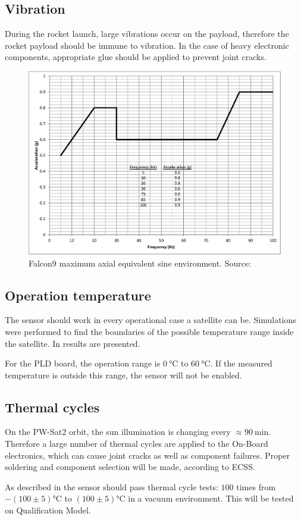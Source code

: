     \subsection{Vibration}
        During the rocket launch, large vibrations occur on the payload, therefore the rocket payload should be immune to vibration. In the case of heavy electronic components, appropriate glue should be applied to prevent joint cracks.
        \begin{figure}[H]
            \centering
            \includegraphics[width=0.5\paperwidth]{img/04/Falcon9_vibration.eps}
            \caption{Falcon9 maximum axial equivalent sine environment. Source: \cite{Falcon9_user_manual}}
            \label{Falcon9_vibration}
        \end{figure}


    \subsection{Operation temperature}
        The sensor should work in every operational case a satellite can be. Simulations were performed to find the boundaries of the  possible temperature range inside the satellite.    In \cite{PWSAT_TCS_CDR} results are presented.

        For the PLD board, the operation range is $\SI{0}{\degreeCelsius}$ to $\SI{60}{\degreeCelsius}$. If the measured temperature is outside this range, the sensor will not be enabled.


    \subsection{Thermal cycles}
        On the PW-Sat2 orbit, the sun illumination is changing every $\approx \SI{90}{\minute}$. Therefore a large number of thermal cycles are applied to the On-Board electronics, which can cause joint cracks as well as component failures. Proper soldering and component selection will be made, according to ECSS.

        As described in \cite{ECSS_Q_ST_70_04C} the sensor should pass thermal cycle tests: $100$ times from $- (100 \pm 5)$\si{\degreeCelsius} to $(100 \pm 5)$\si{\degreeCelsius} in a vacuum environment. This will be tested on Qualification Model.